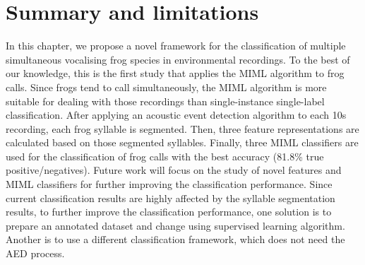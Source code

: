 \section{Summary and limitations}
In this chapter, we propose a novel framework for the classification of multiple simultaneous vocalising frog species in environmental recordings. To the best of our knowledge, this is the first study that applies the MIML algorithm to frog calls. Since frogs tend to call simultaneously, the MIML algorithm is more suitable for dealing with those recordings than single-instance single-label classification. After applying an acoustic event detection algorithm to each 10s recording, each frog syllable is segmented. Then, three feature representations are calculated based on those segmented syllables. Finally, three MIML classifiers are used for the classification of frog calls with the best accuracy (81.8\% true positive/negatives). Future work will focus on the study of novel features and MIML classifiers for further improving the classification performance. Since current classification results are highly affected by the syllable segmentation results, to further improve the classification performance, one solution is to prepare an annotated dataset and change using supervised learning algorithm. Another is to use a different classification framework, which does not need the AED process.  


